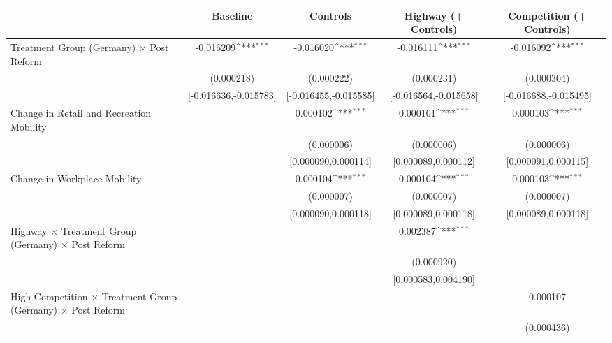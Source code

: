 {
\def\sym#1{\ifmmode^{#1}\else\(^{#1}\)\fi}
\begin{tabular}{l*{4}{c}}
\toprule
                    &\multicolumn{1}{c}{Baseline}&\multicolumn{1}{c}{Controls}&\multicolumn{1}{c}{Highway (+ Controls)}&\multicolumn{1}{c}{Competition (+ Controls)}\\
\midrule
Treatment Group (Germany) $\times$ Post Reform&   -0.016209\sym{***}&   -0.016020\sym{***}&   -0.016111\sym{***}&   -0.016092\sym{***}\\
                    &  (0.000218)         &  (0.000222)         &  (0.000231)         &  (0.000304)         \\
                    &[-0.016636,-0.015783]         &[-0.016455,-0.015585]         &[-0.016564,-0.015658]         &[-0.016688,-0.015495]         \\
Change in Retail and Recreation Mobility&                     &    0.000102\sym{***}&    0.000101\sym{***}&    0.000103\sym{***}\\
                    &                     &  (0.000006)         &  (0.000006)         &  (0.000006)         \\
                    &                     &[0.000090,0.000114]         &[0.000089,0.000112]         &[0.000091,0.000115]         \\
Change in Workplace Mobility&                     &    0.000104\sym{***}&    0.000104\sym{***}&    0.000103\sym{***}\\
                    &                     &  (0.000007)         &  (0.000007)         &  (0.000007)         \\
                    &                     &[0.000090,0.000118]         &[0.000089,0.000118]         &[0.000089,0.000118]         \\
Highway $\times$ Treatment Group (Germany) $\times$ Post Reform&                     &                     &    0.002387\sym{***}&                     \\
                    &                     &                     &  (0.000920)         &                     \\
                    &                     &                     &[0.000583,0.004190]         &                     \\
High Competition $\times$ Treatment Group (Germany) $\times$ Post Reform&                     &                     &                     &    0.000107         \\
                    &                     &                     &                     &  (0.000436)         \\

\end{tabular}}
